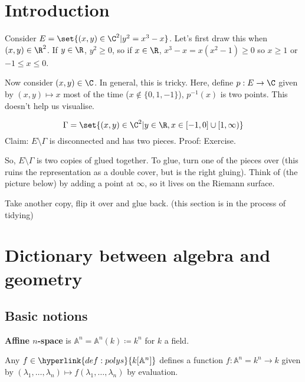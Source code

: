 \documentclass{article}
\newcommand{\A}{\mathbb{A}}
\begin{document}
\maketitle
\tableofcontents

\section*{Introduction}
Consider $E = \set{(x, y) \in \C^2 | y^2 = x^3 - x}$. Let's first draw this when $(x, y) \in \R^2$.
If $y \in \R$, $y^2 \geq 0$, so if $x \in \R$, $x^3 - x = x(x^2 - 1) \geq 0$ so $x \geq 1$ or $-1 \leq x \leq 0$.


Now consider $(x, y) \in \C$. In general, this is tricky.
Here, define $p: E \to \C$ given by $(x, y) \mapsto x$ most of the time ($x \notin \{0, 1, -1\}$), $p^{-1}(x)$ is two points.
This doesn't help us visualise.

\begin{equation*}
    \Gamma = \set{(x, y) \in \C^2 | y \in \R, x \in [-1, 0] \cup [1, \infty)}
\end{equation*}
Claim: $E \setminus \Gamma$ is disconnected and has two pieces.
Proof: Exercise.

So, $E \setminus \Gamma$ is two copies of
glued together. To glue, turn one of the pieces over (this ruins the representation as a double cover, but is the right gluing).
Think of (the picture below) by adding a point at $\infty$, so it lives on the Riemann surface.

Take another copy, flip it over and glue back.
(this section is in the process of tidying)

\clearpage
\section{Dictionary between algebra and geometry}
\subsection{Basic notions}
\begin{defi}
    \textbf{Affine $n$-space} is $\A^n = \A^n(k) \coloneqq k^n$ for $k$ a field.
\end{defi}
Any $f \in \hyperlink{def:polys}{k[\A^n]}$ defines a function $f: \A^n =k^n \to k$ given by $(\lambda_1, \dotsc, \lambda_n) \mapsto f(\lambda_1, \dotsc, \lambda_n)$ by evaluation.
\end{document}
